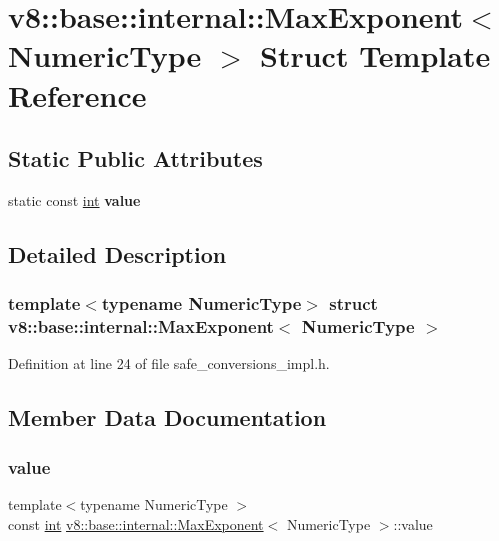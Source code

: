 \hypertarget{structv8_1_1base_1_1internal_1_1MaxExponent}{}\section{v8\+:\+:base\+:\+:internal\+:\+:Max\+Exponent$<$ Numeric\+Type $>$ Struct Template Reference}
\label{structv8_1_1base_1_1internal_1_1MaxExponent}
\subsection*{Static Public Attributes}
\begin{DoxyCompactItemize}
\item 
static const \mbox{\hyperlink{classint}{int}} {\bfseries value}
\end{DoxyCompactItemize}


\subsection{Detailed Description}
\subsubsection*{template$<$typename Numeric\+Type$>$\newline
struct v8\+::base\+::internal\+::\+Max\+Exponent$<$ Numeric\+Type $>$}



Definition at line 24 of file safe\+\_\+conversions\+\_\+impl.\+h.



\subsection{Member Data Documentation}
\mbox{\label{structv8_1_1base_1_1internal_1_1MaxExponent_a22031aba42b35e71cb34d9e9272a7c98}} 
\subsubsection{\texorpdfstring{value}{value}}
{\footnotesize\ttfamily template$<$typename Numeric\+Type $>$ \\
const \mbox{\hyperlink{classint}{int}} \mbox{\hyperlink{structv8_1_1base_1_1internal_1_1MaxExponent}{v8\+::base\+::internal\+::\+Max\+Exponent}}$<$ Numeric\+Type $>$\+::value\hspace{0.3cm}{\ttfamily [static]}}

